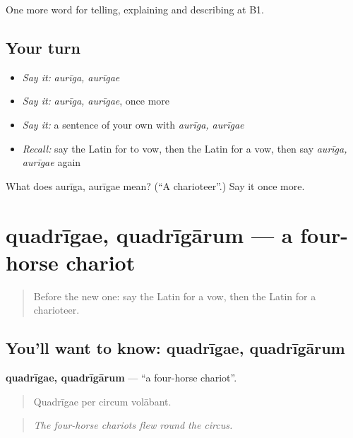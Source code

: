 \begin{grammarlens}[title={What you've built}]
One more word for telling, explaining and describing at B1.
\end{grammarlens}

\subsection*{Your turn}
\begin{itemize}
\raggedright
  \item \emph{Say it:} \emph{aurīga, aurīgae}
  \item \emph{Say it:} \emph{aurīga, aurīgae}, once more
  \item \emph{Say it:} a sentence of your own with \emph{aurīga, aurīgae}
  \item \emph{Recall:} say the Latin for to vow, then the Latin for a vow, then say \emph{aurīga, aurīgae} again
\end{itemize}

\begin{tcolorbox}[breakable,colback=teal!4,colframe=teal!35!black,title={Before you move on}]
What does aurīga, aurīgae mean? (\textquotedblleft{}A charioteer\textquotedblright{}.) Say it once more.
\end{tcolorbox}
\section[quadrīgae, quadrīgārum]{quadrīgae, quadrīgārum — a four-horse chariot}

\label{lesson:LA-C335-quadrigae}



\begin{quote}
Before the new one: say the Latin for a vow, then the Latin for a charioteer.
\end{quote}

\subsection*{You'll want to know: quadrīgae, quadrīgārum}
\textbf{quadrīgae, quadrīgārum} — \textquotedblleft{}a four-horse chariot\textquotedblright{}.

\begin{quote}
Quadrīgae per circum volābant.
\end{quote}

\begin{quote}
\emph{The four-horse chariots flew round the circus.}
\end{quote}

